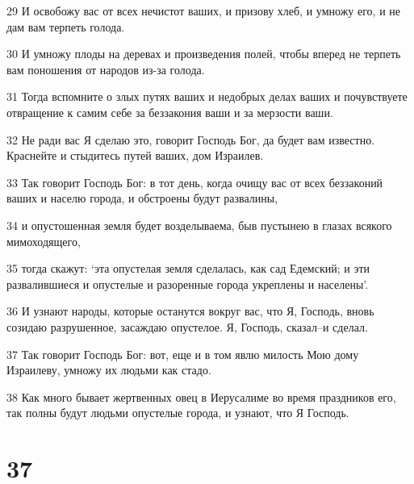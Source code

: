\par 29 И освобожу вас от всех нечистот ваших, и призову хлеб, и умножу его, и не дам вам терпеть голода.
\par 30 И умножу плоды на деревах и произведения полей, чтобы вперед не терпеть вам поношения от народов из-за голода.
\par 31 Тогда вспомните о злых путях ваших и недобрых делах ваших и почувствуете отвращение к самим себе за беззакония ваши и за мерзости ваши.
\par 32 Не ради вас Я сделаю это, говорит Господь Бог, да будет вам известно. Краснейте и стыдитесь путей ваших, дом Израилев.
\par 33 Так говорит Господь Бог: в тот день, когда очищу вас от всех беззаконий ваших и населю города, и обстроены будут развалины,
\par 34 и опустошенная земля будет возделываема, быв пустынею в глазах всякого мимоходящего,
\par 35 тогда скажут: `эта опустелая земля сделалась, как сад Едемский; и эти развалившиеся и опустелые и разоренные города укреплены и населены'.
\par 36 И узнают народы, которые останутся вокруг вас, что Я, Господь, вновь созидаю разрушенное, засаждаю опустелое. Я, Господь, сказал--и сделал.
\par 37 Так говорит Господь Бог: вот, еще и в том явлю милость Мою дому Израилеву, умножу их людьми как стадо.
\par 38 Как много бывает жертвенных овец в Иерусалиме во время праздников его, так полны будут людьми опустелые города, и узнают, что Я Господь.

\chapter{37}

